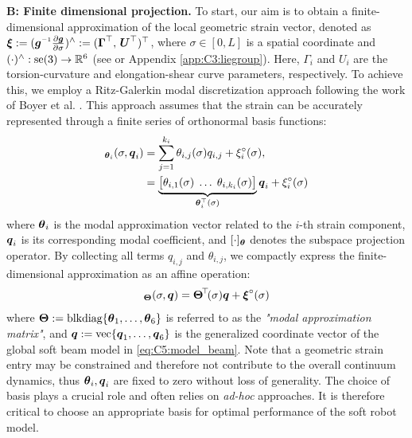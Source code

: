 \textbf{B: Finite dimensional projection.} To start, our aim is to obtain a finite-dimensional approximation of the local geometric strain vector, denoted as $\xiB:= (\gB\inv \tfrac{\p \gB}{\p \sigma})^\wedge := (\GammaB^\top,\,\UB^\top)^\top$, where $\sigma \in [0,L]$ is a spatial coordinate and $(\cdot)^{\wedge}: \textrm{se}(3) \to \mathbb{R}^6$ (see \cite{Murray1994} or Appendix \ref{app:C3:liegroup}). Here, $\Gamma_{i}$ and $U_{i}$ are the torsion-curvature and elongation-shear curve parameters, respectively. To achieve this, we employ a Ritz-Galerkin modal discretization approach following the work of Boyer et al. \cite{Boyer2021}. This approach assumes that the strain can be accurately represented through a finite series of orthonormal basis functions:
%
\begin{align}
[\xi_i]_{\thetaB_i}(\sigma,\q_i) & = \sum_{j=1}^{k_i} \theta_{i,j}(\sigma) q_{i,j} + \xi_i^\circ (\sigma), \notag \\ & = \underbrace{\big[\theta_{i,1}(\sigma)\; \hdots\; \theta_{i,k_i} (\sigma) \big]}_{\thetaB_i^\top(\sigma)} \q_i + \xi_i^\circ(\sigma)
\end{align}
%
where ${\boldsymbol{\theta}}_i$ is the modal approximation vector related to the $i$-th strain component, ${\boldsymbol{q}}_i$ is its corresponding modal coefficient, and $[\cdot]_{{\boldsymbol{\theta}}}$ denotes the subspace projection operator. By collecting all terms $q_{i,j}$ and $\theta_{i,j}$, we compactly express the finite-dimensional approximation as an affine operation:
%
\begin{equation}
[\xiB]_{\ThetaB}(\sigma,\q) = \ThetaB^{\!\top}\!(\sigma) \q + \xiB^{\circ}(\sigma)
\label{eq:C5:xi_computation_POD}
\end{equation}
%
where ${\boldsymbol{\Theta}}:= \textrm{blkdiag}\{{\boldsymbol{\theta}}_1,\dots,{\boldsymbol{\theta}}_6\}$ is referred to as the \textit{"modal approximation matrix"}, and ${\boldsymbol{q}}:=\textrm{vec}\{{\boldsymbol{q}}_1,\dots,{\boldsymbol{q}}_6\}$ is the generalized coordinate vector of the global soft beam model in \eqref{eq:C5:model_beam}. Note that a geometric strain entry may be constrained and therefore not contribute to the overall continuum dynamics, thus ${\boldsymbol{\theta}}_i,{\boldsymbol{q}}_i$ are fixed to zero without loss of generality. The choice of basis plays a crucial role and often relies on \textit{ad-hoc} approaches. It is therefore critical to choose an appropriate basis for optimal performance of the soft robot model. \\
% 

